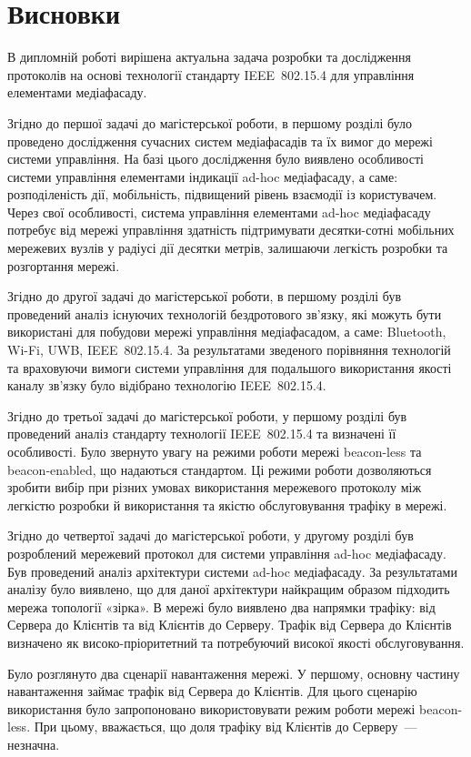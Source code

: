 \documentclass[a4paper,ukrainian,utf8,nocolumnsxix,nocolumnxxxii,nocolumnxxxi,floatsection,equationsection]{eskdtext}
\newcommand{\sectionnonum}[1]{\section*{#1}\addcontentsline{toc}{section}{#1}}
\newcommand{\iee}[0]{IEEE~802.15.4\xspace}
\newcommand{\blm}[0]{beacon-less\xspace}
\newcommand{\bem}[0]{beacon-enabled\xspace}
\begin{document}
\sectionnonum{Висновки}

В дипломній роботі вирішена актуальна задача розробки та дослідження протоколів на основі технології стандарту \iee для управління елементами медіафасаду.

Згідно до першої задачі до магістерської роботи, в першому розділі було проведено дослідження сучасних систем медіафасадів та їх вимог до мережі системи управління. На базі цього дослідження було виявлено особливості системи управління елементами індикації ad-hoc медіафасаду, а саме: розподіленість дії, мобільність, підвищений рівень взаємодії із користувачем. Через свої особливості, система управління елементами ad-hoc медіафасаду потребує від мережі управління здатність підтримувати десятки-сотні мобільних мережевих вузлів у радіусі дії десятки метрів, залишаючи легкість розробки та розгортання мережі.

Згідно до другої задачі до магістерської роботи, в першому розділі був проведений аналіз існуючих технологій бездротового зв’язку, які можуть бути використані для побудови мережі управління медіафасадом, а саме: Bluetooth, Wi-Fi, UWB, \iee. За результатами зведеного порівняння технологій та враховуючи вимоги системи управління для подальшого використання  якості каналу зв'язку було відібрано технологію \iee.

Згідно до третьої задачі до магістерської роботи, у першому розділі був проведений аналіз стандарту технології \iee та визначені її особливості. Було звернуто увагу на режими роботи мережі \blm та \bem, що надаються стандартом. Ці режими роботи дозволяються зробити вибір при різних умовах використання мережевого протоколу між легкістю розробки й використання та якістю обслуговування трафіку в мережі.

Згідно до четвертої задачі до магістерської роботи, у другому розділі був розроблений мережевий  протокол для системи управління ad-hoc медіафасаду. Був проведений аналіз архітектури системи ad-hoc медіафасаду. За результатами аналізу було виявлено, що для даної архітектури найкращим образом підходить мережа топології «зірка». В мережі було виявлено два напрямки трафіку: від Сервера до Клієнтів та від Клієнтів до Серверу. Трафік від Сервера до Клієнтів визначено як високо-пріоритетний та потребуючий високої якості обслуговування.

Було розглянуто два сценарії навантаження мережі. У першому, основну частину навантаження займає трафік від Сервера до Клієнтів. Для цього сценарію використання було запропоновано використовувати режим роботи мережі \blm. При цьому, вважається, що доля трафіку від Клієнтів до Серверу~--- незначна.
\end{document}
